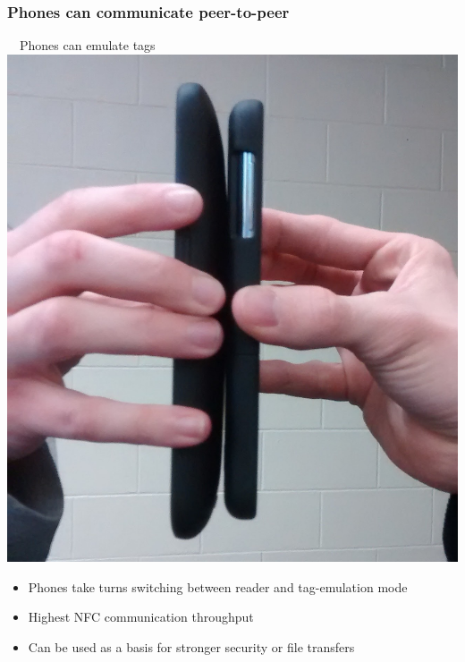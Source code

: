 \documentclass[unknownkeysallowed]{beamer}
\begin{document}
\begin{frame}
\frametitle{Phones can communicate peer-to-peer}
  \begin{center}
  \begin{minipage}{.7\textwidth}
  \begin{block}{~~Phones can emulate tags}\centering
      \includegraphics[width=\linewidth,height=0.2\textheight,keepaspectratio]{figures/peer.jpg}
      \begin{itemize}
  		  \item{Phones take turns switching between reader and tag-emulation mode}
        \pause
  		  \item{Highest NFC communication throughput}
        \pause
  		  \item{Can be used as a basis for stronger security or file transfers}
     	\end{itemize}
  \end{block}
  \end{minipage}
  \end{center}
\end{frame}
\end{document}
